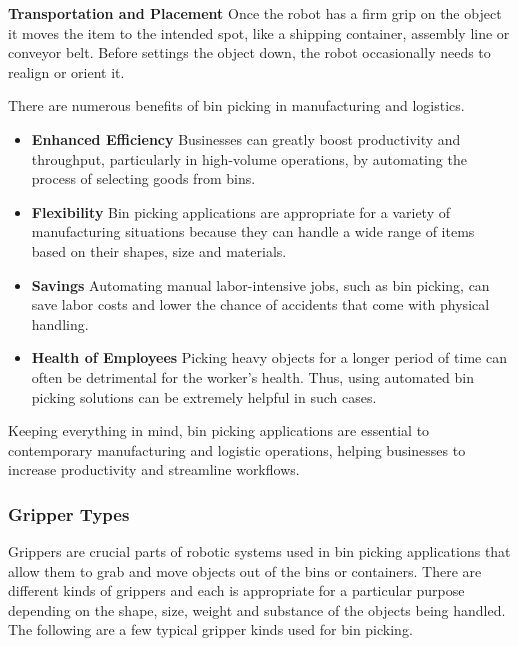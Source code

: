 \vspace{5mm}

\textbf{Transportation and Placement} Once the robot has a firm grip on the object it moves the item to the intended spot, like a shipping container, assembly line or conveyor belt. Before settings the object down, the robot occasionally needs to realign or orient it.\cite{bin_picking}

There are numerous benefits of bin picking in manufacturing and logistics.
\begin{itemize}
  \item \textbf{Enhanced Efficiency} Businesses can greatly boost productivity and throughput, particularly in high-volume operations, by automating the process of selecting goods from bins.
  \item \textbf{Flexibility} Bin picking applications are appropriate for a variety of manufacturing situations because they can handle a wide range of items based on their shapes, size and materials.
  \item \textbf{Savings} Automating manual labor-intensive jobs, such as bin picking, can save labor costs and lower the chance of accidents that come with physical handling.
  \item \textbf{Health of Employees} Picking heavy objects for a longer period of time can often be detrimental for the worker's health. Thus, using automated bin picking solutions can be extremely helpful in such cases.
\end{itemize}
Keeping everything in mind, bin picking applications are essential to contemporary manufacturing and logistic operations, helping businesses to increase productivity and streamline workflows.
\subsubsection{Gripper Types}
Grippers are crucial parts of robotic systems used in bin picking applications that allow them to grab and move objects out of the bins or containers. There are different kinds of grippers and each is appropriate for a particular purpose depending on the shape, size, weight and substance of the objects being handled. The following are a few typical gripper kinds used for bin picking.

\vspace{5mm}


